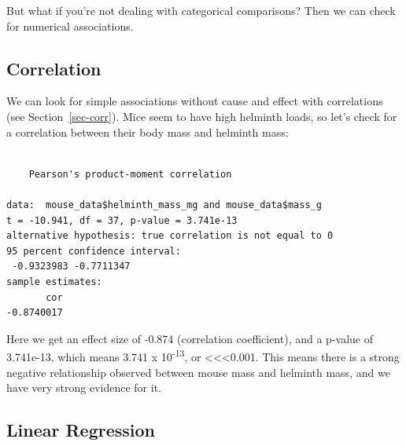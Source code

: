 \documentclass[
  letterpaper,
  DIV=11,
  numbers=noendperiod]{scrreprt}
\newenvironment{Shaded}{\begin{snugshade}}{\end{snugshade}}
\newcommand{\DocumentationTok}[1]{\textcolor[rgb]{0.37,0.37,0.37}{\textit{#1}}}
\newcommand{\FunctionTok}[1]{\textcolor[rgb]{0.28,0.35,0.67}{#1}}
\newcommand{\NormalTok}[1]{\textcolor[rgb]{0.00,0.23,0.31}{#1}}
\newcommand{\OtherTok}[1]{\textcolor[rgb]{0.00,0.23,0.31}{#1}}
\newcommand{\SpecialCharTok}[1]{\textcolor[rgb]{0.37,0.37,0.37}{#1}}
\newcommand{\StringTok}[1]{\textcolor[rgb]{0.13,0.47,0.30}{#1}}
\begin{document}
But what if you're not dealing with categorical comparisons? Then we can
check for numerical associations.

\hypertarget{correlation}{%
\subsection{Correlation}\label{correlation}}

We can look for simple associations without cause and effect with
correlations (see Section~\ref{sec-corr}). Mice seem to have high
helminth loads, so let's check for a correlation between their body mass
and helminth mass:

\begin{Shaded}
\end{Shaded}

\begin{verbatim}

    Pearson's product-moment correlation

data:  mouse_data$helminth_mass_mg and mouse_data$mass_g
t = -10.941, df = 37, p-value = 3.741e-13
alternative hypothesis: true correlation is not equal to 0
95 percent confidence interval:
 -0.9323983 -0.7711347
sample estimates:
       cor 
-0.8740017 
\end{verbatim}

Here we get an effect size of -0.874 (correlation coefficient), and a
p-value of 3.741e-13, which means 3.741 x 10\textsuperscript{-13}, or
\textless\textless\textless0.001. This means there is a strong negative
relationship observed between mouse mass and helminth mass, and we have
very strong evidence for it.

\hypertarget{linear-regression}{%
\subsection{Linear Regression}\label{linear-regression}}
\end{document}
